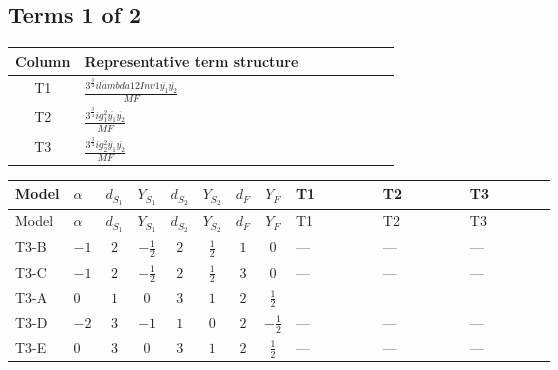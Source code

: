 \documentclass[8pt]{article}
\begin{document}
\begin{landscape}
\subsection*{Terms 1 of 2}
\begin{center}
\begin{tabular}{@{}c >{\raggedright\arraybackslash}p{0.82\linewidth}@{}}
\toprule
Column & Representative term structure \\
\midrule
T1 & \(\displaystyle \frac{3^{\frac{3}{4}} i lambda12Inv1 \overline{y_{1}} \overline{y_{2}}}{MF}\) \\
\midrule
T2 & \(\displaystyle \frac{3^{\frac{3}{4}} i g_{1}^{2} \overline{y_{1}} \overline{y_{2}}}{MF}\) \\
\midrule
T3 & \(\displaystyle \frac{3^{\frac{3}{4}} i g_{2}^{2} \overline{y_{1}} \overline{y_{2}}}{MF}\) \\
\midrule
\bottomrule
\end{tabular}
\end{center}
\smallskip
\tiny
\begin{longtable}{@{}llcccccc >{\raggedright\arraybackslash}p{0.21\linewidth} >{\raggedright\arraybackslash}p{0.21\linewidth} >{\raggedright\arraybackslash}p{0.21\linewidth}@{}}
\toprule
Model & $\alpha$ & $d_{S_1}$ & $Y_{S_1}$ & $d_{S_2}$ & $Y_{S_2}$ & $d_F$ & $Y_F$ & T1 & T2 & T3 \\
\midrule
\endfirsthead
\toprule
Model & $\alpha$ & $d_{S_1}$ & $Y_{S_1}$ & $d_{S_2}$ & $Y_{S_2}$ & $d_F$ & $Y_F$ & T1 & T2 & T3 \\
\midrule
\endhead
T3-B & $-1$ & $2$ & $-\frac{1}{2}$ & $2$ & $\frac{1}{2}$ & $1$ & $0$ & --- & --- & --- \\
\midrule
T3-C & $-1$ & $2$ & $-\frac{1}{2}$ & $2$ & $\frac{1}{2}$ & $3$ & $0$ & --- & --- & --- \\
\midrule
T3-A & $0$ & $1$ & $0$ & $3$ & $1$ & $2$ & $\frac{1}{2}$ & \scriptsize\adjustbox{max width=\linewidth}{$\begin{gathered} \frac{3^{\frac{3}{4}} i lambda12Inv1 \overline{y_{1}} \overline{y_{2}}}{6 MF}\end{gathered}$} & \scriptsize\adjustbox{max width=\linewidth}{$\begin{gathered} \frac{3^{\frac{3}{4}} i g_{1}^{2} \overline{y_{1}} \overline{y_{2}}}{8 MF}\end{gathered}$} & \scriptsize\adjustbox{max width=\linewidth}{$\begin{gathered} \frac{17 \cdot 3^{\frac{3}{4}} i g_{2}^{2} \overline{y_{1}} \overline{y_{2}}}{24 MF}\end{gathered}$} \\
\midrule
T3-D & $-2$ & $3$ & $-1$ & $1$ & $0$ & $2$ & $-\frac{1}{2}$ & --- & --- & --- \\
\midrule
T3-E & $0$ & $3$ & $0$ & $3$ & $1$ & $2$ & $\frac{1}{2}$ & --- & --- & --- \\
\midrule
\bottomrule
\end{longtable}
\clearpage

\end{landscape}
\end{document}
